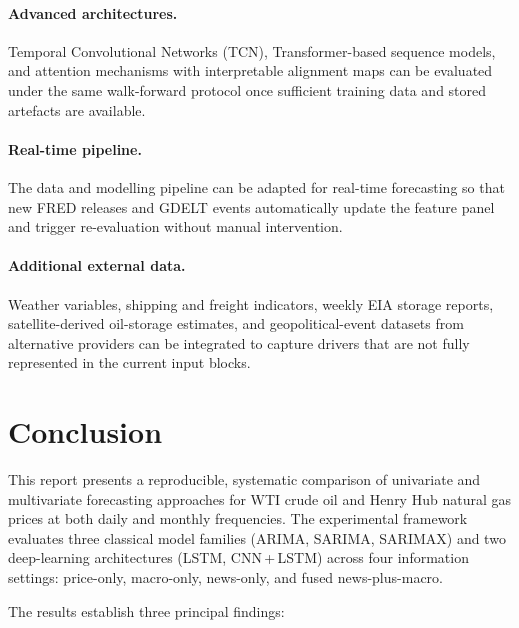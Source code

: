 \documentclass[12pt,a4paper]{article}
\begin{document}
\paragraph{Advanced architectures.} Temporal Convolutional Networks (TCN), Transformer-based sequence models, and attention mechanisms with interpretable alignment maps can be evaluated under the same walk-forward protocol once sufficient training data and stored artefacts are available.

\paragraph{Real-time pipeline.} The data and modelling pipeline can be adapted for real-time forecasting so that new FRED releases and GDELT events automatically update the feature panel and trigger re-evaluation without manual intervention.

\paragraph{Additional external data.} Weather variables, shipping and freight indicators, weekly EIA storage reports, satellite-derived oil-storage estimates, and geopolitical-event datasets from alternative providers can be integrated to capture drivers that are not fully represented in the current input blocks.

\section{Conclusion}\label{sec:conclusion}

This report presents a reproducible, systematic comparison of univariate and multivariate forecasting approaches for WTI crude oil and Henry Hub natural gas prices at both daily and monthly frequencies. The experimental framework evaluates three classical model families (ARIMA, SARIMA, SARIMAX) and two deep-learning architectures (LSTM, CNN\,+\,LSTM) across four information settings: price-only, macro-only, news-only, and fused news-plus-macro.

The results establish three principal findings:
\end{document}
